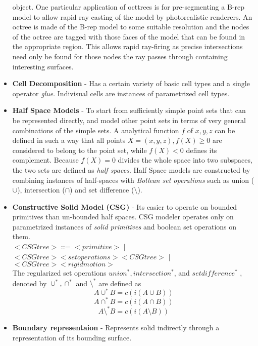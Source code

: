 \documentclass[12pt,a4paper,openbib]{article}
\begin{document}
\begin{itemize}
			object.
			One particular application of octtrees is for pre-segmenting a B-rep 			model to allow rapid ray casting of the model by photorealistic 
			renderers. An octree is made of the B-rep model to some suitable 
			resolution and the nodes of the octree are tagged with those faces 
			of the model that can be found in the appropriate region. This 
			allows rapid ray-firing as precise intersections need only be 
			found for those nodes the ray passes through containing 
			interesting surfaces.
		\item {\bf Cell Decomposition} - Has a certain variety of basic cell
			types and a single operator {\em glue}. Indivisual cells are
			instances of parametrized cell types.
		\item {\bf Half Space Models} - To start from sufficiently simple
			point sets  that can be represented directly, and model other
			point sets in terms of very general combinations of the simple
			sets. A analytical function $f$ of $x,y,z$ can be defined in such
			a way that all points $X = (x,y,z), f(X) \geq 0$ are considered to
			belong to the point set, while $f(X) < 0$ defines its complement.
			Because $f(X) = 0$ divides the whole space into two subspaces, the
			two sets are defined as {\em half spaces}. Half Space models are
			constructed by combining instances of half-spaces with {\em 
			Bollean set operations} such as  union ($\cup$), intersection
			($\cap$) and set difference ($\setminus$).
		\item {\bf Constructive Solid Model (CSG)} - Its easier to operate on 
			bounded primitives than un-bounded half spaces. CSG modeler
			operates only on parametrized instances of {\em solid primitives}
			and boolean set operations on them.\\
				$<CSG tree>$ ::= 	
								$<primitive>$ $\mid$
								$<CSG tree><set operations><CSG tree>$ $\mid$ 
								$<CSG tree><rigid motion>$ \\
			The regularized set operations $union^{*}, intersection^{*}$, and
			$set difference^{*}$ , denoted by $\cup^{*},\cap^{*}$ and 
			$\setminus^{*}$ are defined as
			\begin{equation}
				A \cup^{*} B = c(i(A \cup B)) 
			\end{equation}
			\begin{equation}
				A \cap^{*} B = c(i(A \cap B)) 
			\end{equation}
			\begin{equation}
				A \setminus^{*} B = c(i(A \setminus B)) 
			\end{equation}
		\item {\bf Boundary representaion} - Represents solid indirectly 
			through a representation of its bounding surface.
	\end{itemize}
\end{document}
